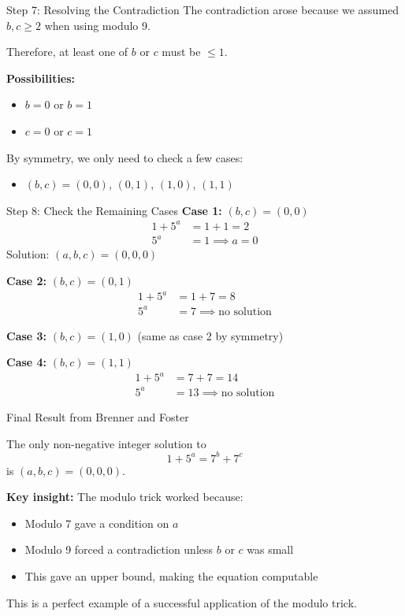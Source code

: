 \begin{frame}{Step 7: Resolving the Contradiction}
    The contradiction arose because we assumed $b,c \geq 2$ when using modulo 9.

    Therefore, at least one of $b$ or $c$ must be $\leq 1$.

    \textbf{Possibilities:}
    \begin{itemize}
        \item $b = 0$ or $b = 1$
        \item $c = 0$ or $c = 1$
    \end{itemize}

    By symmetry, we only need to check a few cases:
    \begin{itemize}
        \item $(b,c) = (0,0)$, $(0,1)$, $(1,0)$, $(1,1)$
    \end{itemize}
\end{frame}

\begin{frame}{Step 8: Check the Remaining Cases}
    \textbf{Case 1:} $(b,c) = (0,0)$
    \begin{align*}
        1 + 5^a &= 1 + 1 = 2 \\
        5^a &= 1 \implies a = 0
    \end{align*}
    Solution: $(a,b,c) = (0,0,0)$

    \textbf{Case 2:} $(b,c) = (0,1)$
    \begin{align*}
        1 + 5^a &= 1 + 7 = 8 \\
        5^a &= 7 \implies \text{no solution}
    \end{align*}

    \textbf{Case 3:} $(b,c) = (1,0)$ (same as case 2 by symmetry)

    \textbf{Case 4:} $(b,c) = (1,1)$
    \begin{align*}
        1 + 5^a &= 7 + 7 = 14 \\
        5^a &= 13 \implies \text{no solution}
    \end{align*}
\end{frame}

\begin{frame}{Final Result from Brenner and Foster}
    \begin{theoremss}
        The only non-negative integer solution to
        \[1 + 5^a = 7^b + 7^c\]
        is $(a,b,c) = (0,0,0)$.
    \end{theoremss}

    \vspace{0.3cm}
    \textbf{Key insight:} The modulo trick worked because:
    \begin{itemize}
        \item Modulo 7 gave a condition on $a$
        \item Modulo 9 forced a contradiction unless $b$ or $c$ was small
        \item This gave an upper bound, making the equation computable
    \end{itemize}

    This is a perfect example of a successful application of the modulo trick.
\end{frame}
